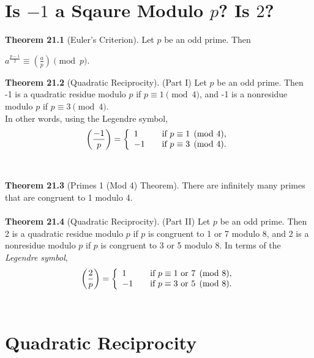 \documentclass{article}
\begin{document}
\section{Is $-1$ a Sqaure Modulo $p$? Is $2$?}

\textbf{Theorem 21.1} (Euler's Criterion). Let $p$ be an odd prime. Then
\begin{center}
$a^{\frac{p-1}{2}} \equiv \left(\frac{a}{p}\right) \pmod p$.
\end{center}
\textbf{Theorem 21.2} (Quadratic Reciprocity). (Part I) Let $p$ be an odd prime. Then -1 is a quadratic residue modulo $p$ if $p\equiv 1\pmod 4$, and -1 is a nonresidue modulo $p$ if $p\equiv3 \pmod 4$.\\
In other words, using the Legendre symbol,
\[ \left(\frac{-1}{p}\right)= \left\{
    \begin{array}{l l}
    1 & \quad \text{if $p\equiv 1\pmod4$,}\\
    -1 & \quad \text{if $p\equiv 3\pmod4$.}
    \end{array} \right.\]\\\\
\textbf{Theorem 21.3} (Primes 1 (Mod 4) Theorem). There are infinitely many primes that are congruent to 1 modulo 4.\\\\
\textbf{Theorem 21.4} (Quadratic Reciprocity). (Part II) Let $p$ be an odd prime. Then 2 is a quadratic residue modulo $p$ if $p$ is congruent to 1 or 7 modulo 8, and 2 is a nonresidue modulo $p$ if $p$ is congruent to 3 or 5 modulo 8. In terms of the \textit{Legendre symbol},
\[ \left(\frac{2}{p}\right)= \left\{
    \begin{array}{l l}
    1 & \quad \text{if $p\equiv1 \text{ or } 7\pmod 8$,}\\
    -1 & \quad \text{if $p\equiv3 \text{ or } 5\pmod 8$.}
    \end{array} \right.\]\\

\section{Quadratic Reciprocity}
\end{document}
